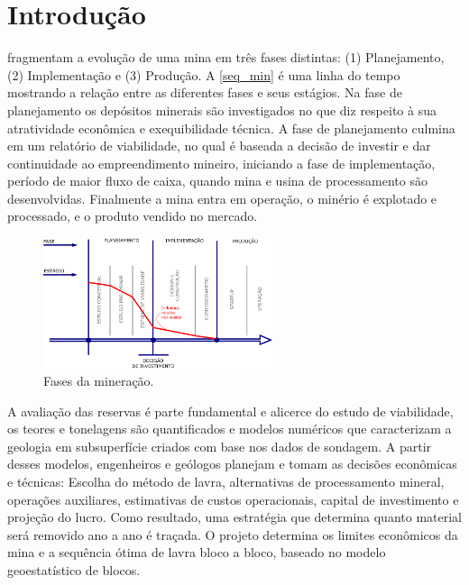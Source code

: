 \chapter{Introdução}

 fragmentam a evolução de uma mina em três fases distintas: (1) Planejamento, (2) Implementação e (3) Produção. A \autoref{seq_min} é uma linha do tempo mostrando a relação entre as diferentes fases e seus estágios. Na fase de planejamento os depósitos minerais são investigados no que diz respeito à sua atratividade econômica e exequibilidade técnica. A fase de planejamento culmina em um relatório de viabilidade, no qual é baseada a decisão de investir e dar continuidade ao empreendimento mineiro, iniciando a fase de implementação, período de maior fluxo de caixa, quando mina e usina de processamento são desenvolvidas. Finalmente a mina entra em operação, o minério é explotado e processado, e o produto vendido no mercado.     

\begin{figure}[!htb]
	\caption{\label{seq_min}Fases da mineração.}
	\begin{center}
		\includegraphics[width=0.6\textwidth]{introducao/min_fases}
	\end{center}
\end{figure}

A avaliação das reservas é parte fundamental e alicerce do estudo de viabilidade, os teores e tonelagens são quantificados e modelos numéricos que caracterizam a geologia em subsuperfície criados com base nos dados de sondagem. A partir desses modelos, engenheiros e geólogos planejam e tomam as decisões econômicas e técnicas: Escolha do método de lavra, alternativas de processamento mineral, operações auxiliares, estimativas de custos operacionais, capital de investimento e projeção do lucro. Como resultado, uma estratégia que determina quanto material será removido ano a ano é traçada. O projeto determina os limites econômicos da mina e a sequência ótima de lavra bloco a bloco, baseado no modelo geoestatístico de blocos.

